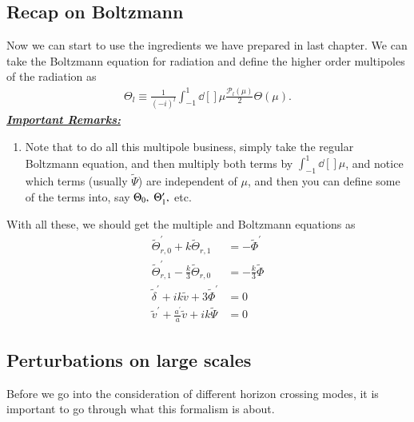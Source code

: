 \documentclass[a4paper, 12pt]{article}
\begin{document}
{{    \subsection{Recap on Boltzmann}%
      \label{sub:Recap on Boltzmann}
      Now we can start to use the ingredients we have prepared in last
      chapter. We can take the Boltzmann equation for radiation and
      define the higher order multipoles of the radiation as 
      \begin{align}
        \label{multipoles radiation}
        \Theta_{l} \equiv \frac{1}{(-i)^{l}} \int_{-1}^{1}
        \dd[]{\mu} \frac{\mathcal{P}_l(\mu)}{2} \Theta(\mu).
      \end{align}
      \underline{\textbf{\textit{Important Remarks: }}}
        \begin{enumerate}
          \item[\circ] Note that to do all this multipole
          business, simply take the regular Boltzmann equation, and
          then multiply both terms by \( \int_{-1}^{1} \dd[]{\mu}
          \), and notice which terms (usually \( \tilde{\Psi} \))
          are independent of \( \mu \), and then you can define
          some of the terms into, say \( \Theta_0,
          \hspace{0.1cm}\Theta_1^{\prime},  \) etc.
        \end{enumerate}
      
      With all these, we should get the multiple and Boltzmann
      equations as 
      \begin{align}
        \label{all CMB equation}
        \tilde{\Theta}_{r, 0}^{\prime} + k \tilde{\Theta}_{r, 1} &= -
        \tilde{\Phi}^{\prime} \\ 
        \tilde{\Theta}_{r, 1}^{\prime}  - \frac{k}{3}
        \tilde{\Theta}_{r, 0}^{} &= - \frac{k}{3} \tilde{\Phi}  \\ 
        \tilde{\delta}^{\prime} + i k \tilde{v} + 3
        \tilde{\Phi}^{\prime} &=  0 \\ 
        \tilde{v}^{\prime} + \frac{a^{\prime}}{a} \tilde{v} + i k
        \tilde{\Psi} &= 0 
      \end{align}

      \subsection{Perturbations on large scales}%
        \label{sub:Perturbations on large scales}
      
      Before we go into the consideration of different horizon
      crossing modes, it is important to go through what this
      formalism is about. 
      
}}
\end{document}
